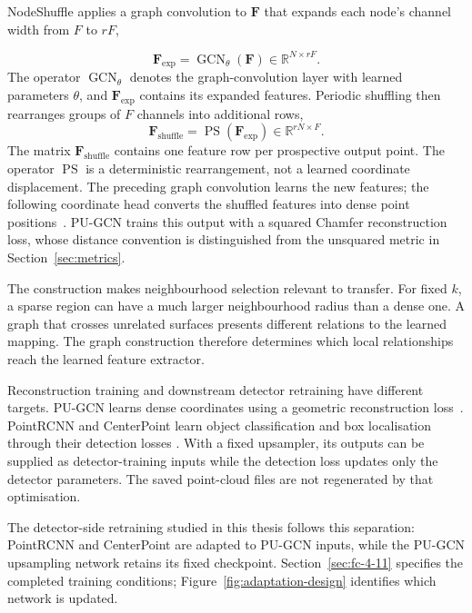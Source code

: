 NodeShuffle applies a graph convolution to $\mathbf F$ that expands each
node's channel width from $F$ to $rF$,

\begin{equation}
 \mathbf F_\mathrm{exp}=\operatorname{GCN}_\theta(\mathbf F)
 \in\mathbb R^{N\times rF}.
 \label{eq:nodeshuffle_expand}
\end{equation}
The operator $\operatorname{GCN}_\theta$ denotes the graph-convolution
layer with learned parameters $\theta$, and $\mathbf F_\mathrm{exp}$
contains its expanded features. Periodic shuffling then rearranges groups
of $F$ channels into additional rows,
\begin{equation}
 \mathbf F_\mathrm{shuffle}=\operatorname{PS}(\mathbf F_\mathrm{exp})
 \in\mathbb R^{rN\times F}.
 \label{eq:nodeshuffle_ps}
\end{equation}
The matrix $\mathbf F_\mathrm{shuffle}$ contains one feature row per
prospective output point. The operator $\operatorname{PS}$ is a
deterministic rearrangement, not a learned coordinate displacement. The preceding graph convolution learns the new
features; the following coordinate head converts the shuffled features
into dense point positions~\cite{qian2021pugcn}. PU-GCN trains this output
with a squared Chamfer reconstruction loss, whose distance convention is
distinguished from the unsquared metric in Section~\ref{sec:metrics}.

The construction makes neighbourhood selection relevant to transfer.
For fixed $k$, a sparse region can have a much larger neighbourhood radius
than a dense one. A graph that crosses unrelated surfaces presents
different relations to the learned mapping. The graph construction therefore determines which local relationships
reach the learned feature extractor.

Reconstruction training and downstream detector retraining have different
targets. PU-GCN learns dense coordinates using a geometric reconstruction
loss~\cite{qian2021pugcn}. PointRCNN and CenterPoint learn object
classification and box localisation through their detection losses
\cite{shi2019pointrcnn,yin2021centerpoint}. With a fixed upsampler, its
outputs can be supplied as detector-training inputs while the detection
loss updates only the detector parameters. The saved point-cloud files are not regenerated by that optimisation.

The detector-side retraining studied in this thesis follows this
separation: PointRCNN and CenterPoint are adapted to PU-GCN inputs,
while the PU-GCN upsampling network retains its fixed checkpoint.
Section~\ref{sec:fc-4-11} specifies the completed training conditions;
Figure~\ref{fig:adaptation-design} identifies which network is updated.

